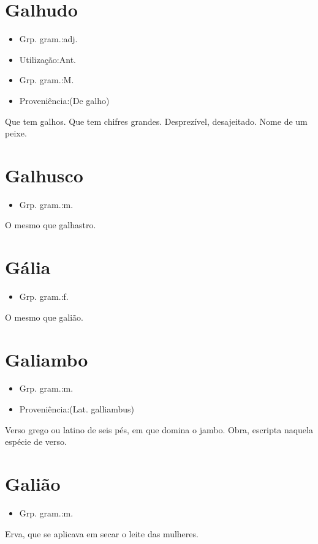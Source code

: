 \section{Galhudo}
\begin{itemize}
\item {Grp. gram.:adj.}
\end{itemize}
\begin{itemize}
\item {Utilização:Ant.}
\end{itemize}
\begin{itemize}
\item {Grp. gram.:M.}
\end{itemize}
\begin{itemize}
\item {Proveniência:(De \textunderscore galho\textunderscore )}
\end{itemize}
Que tem galhos.
Que tem chifres grandes.
Desprezível, desajeitado.
Nome de um peixe.
\section{Galhusco}
\begin{itemize}
\item {Grp. gram.:m.}
\end{itemize}
O mesmo que \textunderscore galhastro\textunderscore .
\section{Gália}
\begin{itemize}
\item {Grp. gram.:f.}
\end{itemize}
O mesmo que \textunderscore galião\textunderscore .
\section{Galiambo}
\begin{itemize}
\item {Grp. gram.:m.}
\end{itemize}
\begin{itemize}
\item {Proveniência:(Lat. \textunderscore galliambus\textunderscore )}
\end{itemize}
Verso grego ou latino de seis pés, em que domina o jambo.
Obra, escripta naquela espécie de verso.
\section{Galião}
\begin{itemize}
\item {Grp. gram.:m.}
\end{itemize}
Erva, que se aplicava em secar o leite das mulheres.
